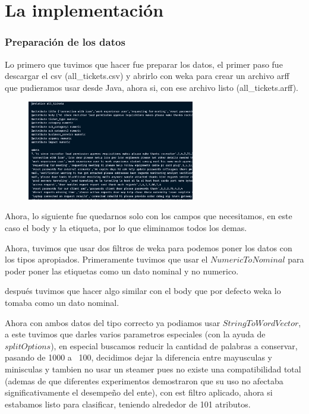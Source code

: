 \documentclass[12pt, fleqn]{report}                             %
\theoremstyle{break}                                            %
\begin{document}
    \chapter{La implementación}

        \subsection{Preparación de los datos}

        Lo primero que tuvimos que hacer fue preparar los datos, el primer paso fue descargar el csv (all\_tickets.csv) y abrirlo con weka para crear
        un archivo arff que pudieramos usar desde Java, ahora si, con ese archivo listo (all\_tickets.arff).

        \begin{figure}[h!]
            \centering
            \includegraphics[width=0.65\textwidth]{ff}
        \end{figure}

        Ahora, lo siguiente fue quedarnos solo con los campos que necesitamos, en este caso el body y la etiqueta, por lo que eliminamos
        todos los demas.

        Ahora, tuvimos que usar dos filtros de weka para podemos poner los datos con los tipos apropiados.
        Primeramente tuvimos que usar el $NumericToNominal$ para poder poner las etiquetas como un dato nominal y no numerico.

        después tuvimos que hacer algo similar con el body que por defecto weka lo tomaba como un dato nominal.

        Ahora con ambos datos del tipo correcto ya podiamos usar $StringToWordVector$, a este tuvimos que darles varios parametros
        especiales (con la ayuda de $splitOptions$), en especial buscamos reducir la cantidad de palabras a conservar, pasando 
        de 1000 a ~100, decidimos dejar la diferencia entre mayusculas y minisculas y tambien no usar un steamer pues no existe una
        compatibilidad total (ademas de que diferentes experimentos demostraron que su uso no afectaba significativamente el desempeño del
        ente), con est filtro aplicado, ahora si estabamos listo para clasificar, teniendo alrededor de 101 atributos.
\end{document}
